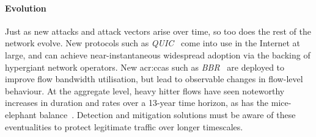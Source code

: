\paragraph{Evolution}
Just as new attacks and attack vectors arise over time, so too does the rest of the network evolve.
New protocols such as \emph{QUIC}~\parencite{DBLP:conf/sigcomm/LangleyRWVKZYKS17} come into use in the Internet at large, and can achieve near-instantaneous widespread adoption via the backing of hypergiant network operators.
New \glspl{acr:cca} such as \emph{BBR}~\parencite{DBLP:journals/queue/CardwellCGYJ16} are deployed to improve flow bandwidth utilisation, but lead to observable changes in flow-level behaviour.
At the aggregate level, heavy hitter flows have seen noteworthy increases in duration and rates over a 13-year time horizon, as has the mice-elephant balance~\parencite{DBLP:conf/anrw/BauerJHBC21}.
Detection and mitigation solutions must be aware of these eventualities to protect legitimate traffic over longer timescales.

%


%



